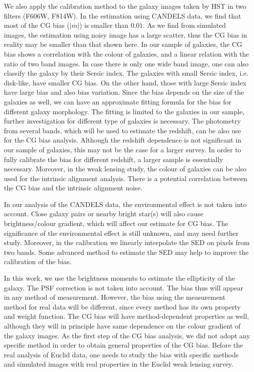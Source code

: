 \documentclass[useAMS,usenatbib]{mn2e}
\begin{document}
We also apply the calibration method to the galaxy images taken by HST
in two filters (F606W, F814W). In the estimation using CANDELS data,
we find that most of the CG bias ($|m|$) is smaller than $0.01$. 
As we find from simulated
images, the estimation using noisy image has a large scatter, thus the
CG bias in reality may be smaller than that shown here. 
%
In our sample of galaxies, the CG bias shows a correlation with the
colour of galaxies, and a linear relation with the ratio of two band
images.  In case there is only one wide band image, one can also
classify the galaxy by their Sersic index. The galaxies with small
Sersic index, i.e. disk-like, have smaller CG bias. On the other hand,
those with large Sersic index have large bias and also bias variation.
Since the bias depends on the size of the galaxies as well, we can
have an approximate fitting formula for the bias for different galaxy
morphology. The fitting is limited to the galaxies in our sample,
further investigation for different type of galaxies is necessary. The
photometry from several bands, which will be used to estimate the
redshift, can be also use for the CG bias analysis. Although the
redshift dependence is not significant in our sample of galaxies, this
may not be the case for a larger survey. In order to fully calibrate
the bias for different redshift, a larger sample is essentially
necessary. Moreover, in the weak lensing study, the colour of galaxies
can be also used for the intrinsic alignment analysis. There is a
potential correlation between the CG bias and the intrinsic alignment
noise.

In our analysis of the CANDELS data, the environmental effect is not
taken into account. Close galaxy pairs or nearby bright star(s) will
also cause brightness/colour gradient, which will affect our estimate
for CG bias. The significance of the environmental effect is still
unknown, and may need further study. Moreover, in the calibration we
linearly interpolate the SED on pixels from two bands. Some advanced
method to estimate the SED \citep[e.g.][]{2016A&A...589A...2J} may
help to improve the calibration of the bias.

In this work, we use the brightness moments to estimate the
ellipticity of the galaxy. The PSF correction is not taken into
account. The bias thus will appear in any method of measurement.
However, the bias using the measurement method for real data
will be different, since every method has its own property and weight
function. The CG bias will have method-dependent properties as well,
although they will in principle have same dependence on the colour
gradient of the galaxy images. As the first step of the CG bias
analysis, we did not adopt any specific method in order to obtain
general properties of the CG bias. Before the real analysis of Euclid
data, one needs to study the bias with specific methods and simulated
images with real properties in the Euclid weak lensing survey.
\end{document}
